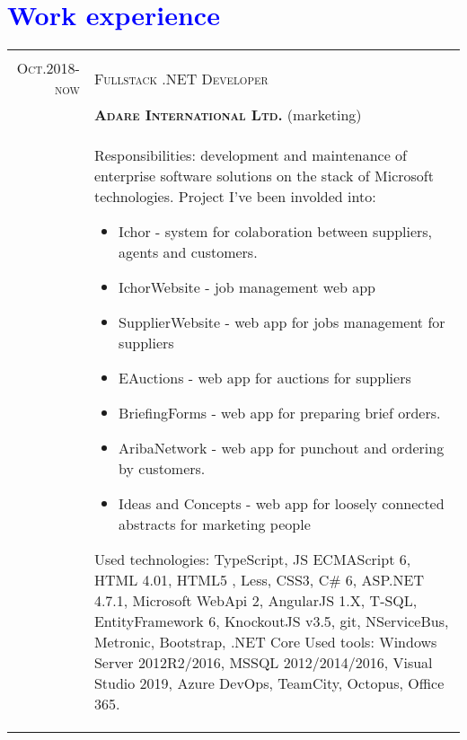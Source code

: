 \documentclass[a4paper,12pt]{article}
\begin{document}
\vspace{3em}
\section{\textcolor{Blue}{Work experience}}
\begin{tabular}{r|p{12cm}}
	\multicolumn{2}{c}{}\\
	\textsc{Oct.2018-now}
	&\textsc{Fullstack .NET Developer } \\
	&\textsc{\textbf{Adare International Ltd.}} (marketing) \\
	&\footnotesize{
		Responsibilities: development and maintenance of enterprise software solutions on the stack of Microsoft technologies. \newline
		Project I've been involded into:
		\begin{itemize}
			\item Ichor - system for colaboration between suppliers, agents and customers.
			\item IchorWebsite - job management web app
			\item SupplierWebsite - web app for jobs management for suppliers
			\item EAuctions - web app for auctions for suppliers
			\item BriefingForms - web app for preparing brief orders.
			\item AribaNetwork - web app for punchout and ordering by customers.
			\item Ideas and Concepts - web app for loosely connected abstracts for marketing people
		\end{itemize}
		Used technologies: \newline
		TypeScript, JS ECMAScript 6, HTML 4.01, HTML5 , Less, CSS3, C\# 6, ASP.NET 4.7.1, Microsoft WebApi 2, AngularJS 1.X, T-SQL,
		EntityFramework 6, KnockoutJS v3.5, git, NServiceBus, Metronic, Bootstrap, .NET Core \newline
		Used tools: \newline
		Windows Server 2012R2/2016, MSSQL 2012/2014/2016, Visual Studio 2019, Azure DevOps, TeamCity, Octopus, Office 365.
	}\\
	
\end{tabular}
\end{document}

